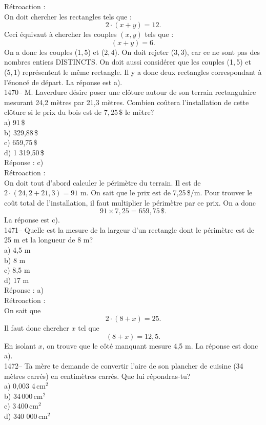 R\'etroaction :\\
On doit chercher les rectangles tels que : $$2\cdot(x+y)=12.$$Ceci
\'equivaut \`a chercher les couples $(x, y)$ tels que :
$$(x+y)=6.$$ On a donc les couples (1,\,5) et (2,\,4). On doit
rejeter (3,\,3), car ce ne sont pas des nombres entiers DISTINCTS.
On doit aussi consid\'erer que les couples (1,\,5) et (5,\,1)
repr\'esentent le m\^eme rectangle. Il y a donc deux rectangles
correspondant \`a l'\'enonc\'e
de d\'epart. La r\'eponse est a).\\

1470-- M. Laverdure d\'esire poser une cl\^oture autour de son terrain
rectangulaire mesurant 24,2 m\`etres par 21,3 m\`etres. Combien
co\^utera l'installation de cette cl\^oture si le prix du bois est de
$7,25\,\$$ le m\`etre?\\

a) 91\,\$\\
b) 329,88\,\$\\
c) 659,75\,\$\\
d) 1 319,50\,\$\\

R\'eponse : c)\\

R\'etroaction :\\
On doit tout d'abord calculer le p\'erim\`etre du terrain. Il est de
$2\cdot(24,2+21,3)=91$ m. On sait que le prix est de 7,25\,\$/m.
Pour trouver le co\^ut total de l'installation, il faut multiplier
le
p\'erim\`etre par ce prix. On a donc $$91\times7,25=659,75\,\$.$$ La
r\'eponse est c).\\

1471-- Quelle est la mesure de la largeur d'un rectangle dont le
p\'erim\`etre
est de 25 m et la longueur de 8 m?\\
a) 4,5 m\\
b) 8 m\\
c) 8,5 m\\
d) 17 m \\

R\'eponse : a)\\

R\'etroaction :\\
On sait que $$2\cdot(8+x)=25.$$ Il faut donc chercher $x$ tel que
$$(8+x)=12,5.$$ En isolant $x$, on trouve que le
c\^ot\'e manquant mesure 4,5 m. La r\'eponse est donc a).\\

1472-- Ta m\`ere te demande de convertir l'aire de son plancher de
cuisine (34 m\`etres carr\'es) en centim\`etres carr\'es.
Que lui r\'epondras-tu?\\
a) 0,003 4\,cm$^{2}$\\
b) 34\,000\,cm$^{2}$\\
c) 3\,400\,cm$^{2}$\\
d) 340 000\,cm$^{2}$\\

